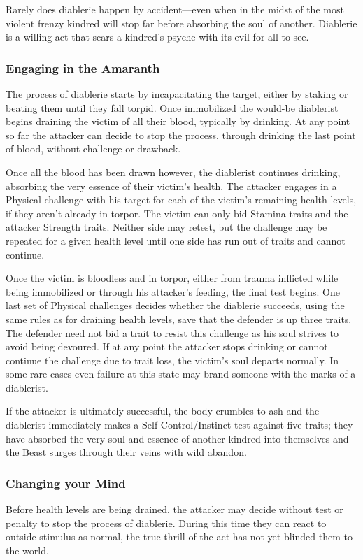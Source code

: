 Rarely does diablerie happen by accident---even when in the midst of the most violent frenzy 
kindred will stop far before absorbing the soul of another.  Diablerie is a willing act that 
scars a kindred's psyche with its evil for all to see.

\subsubsection{Engaging in the Amaranth}
The process of diablerie starts by incapacitating the target, either by staking or beating 
them until they fall torpid.  Once immobilized the would-be diablerist begins draining the 
victim of all their blood, typically by drinking.  At any point so far the attacker can 
decide to stop the process, through drinking the last point of blood, without challenge or 
drawback.

Once all the blood has been drawn however, the diablerist continues drinking, absorbing 
the very essence of their victim's health.  The attacker engages in a Physical challenge 
with his target for each of the victim's remaining health levels, if they aren't already in 
torpor.  The victim can only bid Stamina traits and the attacker Strength traits.  Neither 
side may retest, but the challenge may be repeated for a given health level until one side 
has run out of traits and cannot continue.

Once the victim is bloodless and in torpor, either from trauma inflicted while being 
immobilized or through his attacker's feeding, the final test begins.  One last set of 
Physical challenges decides whether the diablerie succeeds, using the same rules as for 
draining health levels, save that the defender is up three traits.  The defender need not bid 
a trait to resist this challenge as his soul strives to avoid being devoured.  If at any point 
the attacker stops drinking or cannot continue the challenge due to trait loss, the victim's 
soul departs normally.  In some rare cases even failure at this state may brand someone with the 
marks of a diablerist.

If the attacker is ultimately successful, the body crumbles to ash and the diablerist 
immediately makes a Self-Control/Instinct test against five traits; they have absorbed 
the very soul and essence of another kindred into themselves and the Beast surges through 
their veins with wild abandon.

\subsubsection{Changing your Mind}
Before health levels are being drained, the attacker may decide without test or penalty to 
stop the process of diablerie.  During this time they can react to outside stimulus as 
normal, the true thrill of the act has not yet blinded them to the world.

